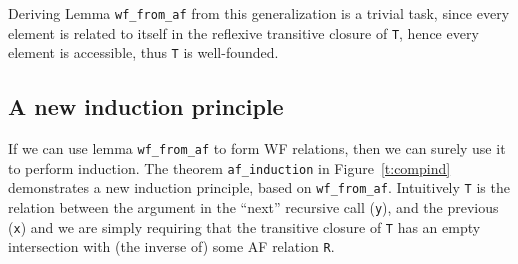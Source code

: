 \documentclass{llncs}
\begin{document}

Deriving Lemma \lstinline|wf_from_af| from this generalization is a trivial task, since every element
is related to itself in the reflexive transitive closure of \lstinline|T|, hence every element is accessible, thus
\lstinline|T| is well-founded.

\subsection{A new induction principle}\label{ssect:new-induction}

If we can use lemma \lstinline|wf_from_af| to form WF relations, then we can surely use it to 
perform induction. The theorem \lstinline|af_induction| in Figure~\ref{t:compind} demonstrates 
a new induction principle, based on \lstinline|wf_from_af|. 
Intuitively \lstinline|T| is the relation between the argument in the ``next'' recursive 
call (\lstinline|y|), and the previous (\lstinline|x|) and we are simply requiring that 
the transitive closure of \lstinline|T| has an empty intersection with (the inverse of) 
some AF relation \lstinline|R|. 
\end{document}
